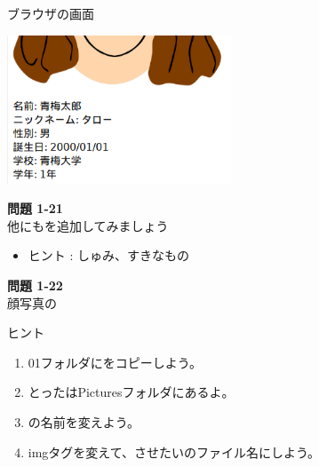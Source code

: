 \bigskip



ブラウザの画面

\includegraphics[width=0.5\textwidth]{text01-img/textbook-img173.png}



\clearpage

\noindent \textbf{問題 1-21}\\
他にもを追加してみましょう

\begin{itemize}
  \item ヒント : しゅみ、すきなもの
\end{itemize}

\noindent \textbf{問題 1-22}\\
顔写真の

ヒント

\begin{enumerate}
  \item
        01フォルダにをコピーしよう。
  \item とったはPicturesフォルダにあるよ。
  \item {}の名前を変えよう。
  \item
        imgタグを変えて、させたいのファイル名にしよう。
\end{enumerate}

\bigskip


\bigskip

\clearpage

